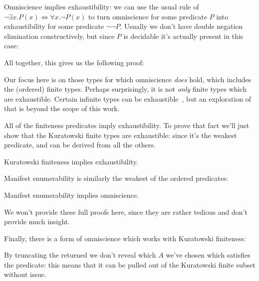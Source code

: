 Omniscience implies exhaustibility: we can use the usual rule of \(\neg \exists x. P(x) \iff \forall x. \neg P(x) \)
to turn omniscience for some predicate \(P\) into exhaustibility for some
predicate \(\neg \neg P\).
Usually we don't have double negation elimination constructively, but since
\(P\) is decidable it's actually present in this case:
\begin{agdalisting*}
\end{agdalisting*}
All together, this gives us the following proof:
\begin{agdalisting*}
\end{agdalisting*}

Our focus here is on those types for which omniscience \emph{does} hold,
which includes the (ordered) finite types.
Perhaps surprisingly, it is not \emph{only} finite types which are exhaustible.
Certain infinite types can be
exhaustible~\citep{escardoInfiniteSetsThat2007}, but an exploration of that is
beyond the scope of this work.

All of the finiteness predicates imply exhaustibility.
To prove that fact we'll just show that the Kuratowski finite types are
exhaustible: since it's the weakest predicate, and can be derived from all the
others.
\begin{lemma}
  Kuratowski finiteness implies exhaustibility.
\end{lemma}
Manifest enumerability is similarly the weakest of the ordered predicates:
\begin{lemma}
  Manifest enumerability implies omniscience.
\end{lemma}
We won't provide these full proofs here, since they are rather tedious and don't
provide much insight.

Finally, there is a form of omniscience which works with Kuratowski finiteness:
\begin{agdalisting*}
\end{agdalisting*}
By truncating the returned \AgdaDatatype{\ensuremath{\Sigma}} we don't reveal
which \(A\) we've chosen which satisfies the predicate: this means that it can
be pulled out of the Kuratowski finite subset without issue.
\begin{agdalisting*}
\end{agdalisting*}
